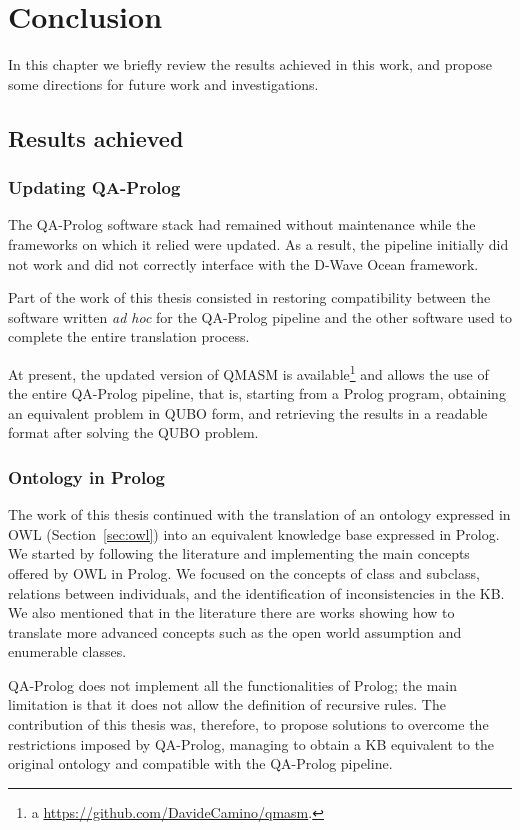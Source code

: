 \chapter{Conclusion}
\label{ch:conclusion}
In this chapter we briefly review the results achieved in this work, and propose some directions for future work and investigations.

\section{Results achieved}
\subsection{Updating QA-Prolog}
The QA-Prolog software stack had remained without maintenance while the frameworks on which it relied were updated. As a result, the pipeline initially did not work and did not correctly interface with the D-Wave Ocean framework.

Part of the work of this thesis consisted in restoring compatibility between the software written \textit{ad hoc} for the QA-Prolog pipeline and the other software used to complete the entire translation process.

At present, the updated version of QMASM is available\footnote{a \url{https://github.com/DavideCamino/qmasm}.} and allows the use of the entire QA-Prolog pipeline, that is, starting from a Prolog program, obtaining an equivalent problem in QUBO form, and retrieving the results in a readable format after solving the QUBO problem.

\subsection{Ontology in Prolog}
The work of this thesis continued with the translation of an ontology expressed in OWL (Section~\ref{sec:owl}) into an equivalent knowledge base expressed in Prolog. We started by following the literature and implementing the main concepts offered by OWL in Prolog. We focused on the concepts of class and subclass, relations between individuals, and the identification of inconsistencies in the KB. We also mentioned that in the literature there are works showing how to translate more advanced concepts such as the open world assumption and enumerable classes.

QA-Prolog does not implement all the functionalities of Prolog; the main limitation is that it does not allow the definition of recursive rules. The contribution of this thesis was, therefore, to propose solutions to overcome the restrictions imposed by QA-Prolog, managing to obtain a KB equivalent to the original ontology and compatible with the QA-Prolog pipeline.

